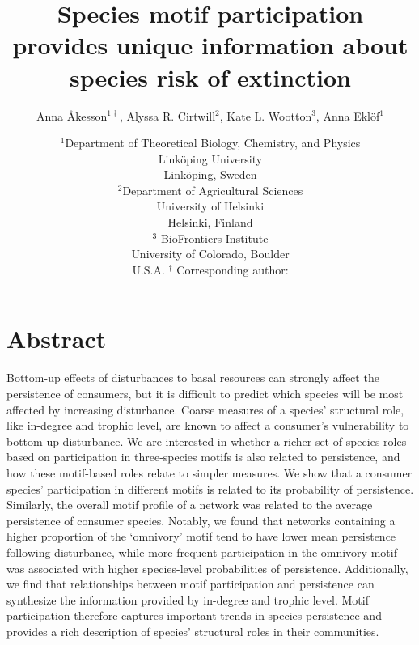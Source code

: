 \documentclass[12pt]{article}
\title{Species motif participation provides unique information about species risk of extinction}
\author{Anna \r{A}kesson$^{1\dagger}$, Alyssa R. Cirtwill$^{2}$, Kate L. Wootton$^{3}$, Anna Ekl\"{o}f$^{1}$}
\date{\small$^1$Department of Theoretical Biology, Chemistry, and Physics\\ 
Link\"{o}ping University\\
Link\"{o}ping, Sweden\\
\medskip
\small$^2$Department of Agricultural Sciences\\
University of Helsinki\\
Helsinki, Finland\\
\medskip
\small$^3$ BioFrontiers Institute\\
University of Colorado, Boulder\\
U.S.A.
\medskip
$^\dagger$ Corresponding author:\\
}
\begin{document}
 
\maketitle 
\linenumbers
\raggedright

\setlength{\parindent}{15pt} 


\section*{Abstract}


    Bottom-up effects of disturbances to basal resources can strongly affect the persistence of consumers, but it is difficult to predict which species will be most affected by increasing disturbance.
    Coarse measures of a species' structural role, like in-degree and trophic level, are known to affect a consumer's vulnerability to bottom-up disturbance.
    We are interested in whether a richer set of species roles based on participation in three-species motifs is also related to persistence, and how these motif-based roles relate to simpler measures.
    We show that a consumer species' participation in different motifs is related to its probability of persistence. 
    Similarly, the overall motif profile of a network was related to the average persistence of consumer species.
    Notably, we found that networks containing a higher proportion of the `omnivory' motif tend to have lower mean persistence following disturbance, while more frequent participation in the omnivory motif was associated with higher species-level probabilities of persistence.
    Additionally, we find that relationships between motif participation and persistence can synthesize the information provided by in-degree and trophic level.
    Motif participation therefore captures important trends in species persistence and provides a rich description of species' structural roles in their communities.
\end{document}
